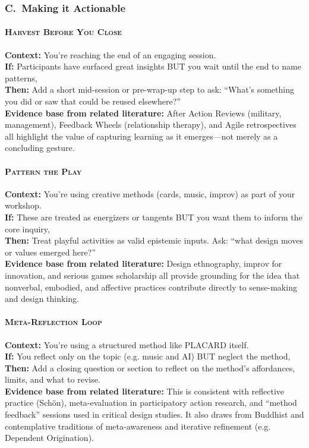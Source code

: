 \documentclass[acmlarge,timestamp]{acmart}
\begin{document}
\subsubsection*{C.~Making it Actionable}

\paragraph*{{\scshape Harvest Before You Close}}

\noindent \textbf{Context:} You’re reaching the end of an engaging session.\\
\textbf{If:} Participants have surfaced great insights BUT you wait until the end to name patterns,\\
\textbf{Then:} Add a short mid-session or pre-wrap-up step to ask: “What’s something you did or saw that could be reused elsewhere?”\\
\textbf{Evidence base from related literature:} After Action Reviews (military, management), Feedback Wheels (relationship therapy), and Agile retrospectives all highlight the value of capturing learning as it emerges—not merely as a concluding gesture.

\paragraph*{{\scshape Pattern the Play}}

\noindent \textbf{Context:} You’re using creative methods (cards, music, improv) as part of your workshop.\\
\textbf{If:} These are treated as energizers or tangents BUT you want them to inform the core inquiry,\\
\textbf{Then:} Treat playful activities as valid epistemic inputs. Ask: “what design moves or values emerged here?”\\
\textbf{Evidence base from related literature:} Design ethnography, improv for innovation, and serious games scholarship all provide grounding for the idea that nonverbal, embodied, and affective practices contribute directly to sense-making and design thinking.

\paragraph*{{\scshape Meta-Reflection Loop}}

\noindent \textbf{Context:} You’re using a structured method like PLACARD itself.\\
\textbf{If:} You reflect only on the topic (e.g. music and AI) BUT neglect the method,\\
\textbf{Then:} Add a closing question or section to reflect on the method’s affordances, limits, and what to revise.\\
\textbf{Evidence base from related literature:} This is consistent with reflective practice (Schön), meta-evaluation in participatory action research, and “method feedback” sessions used in critical design studies. It also draws from Buddhist and contemplative traditions of meta-awareness and iterative refinement (e.g. Dependent Origination).
\end{document}
